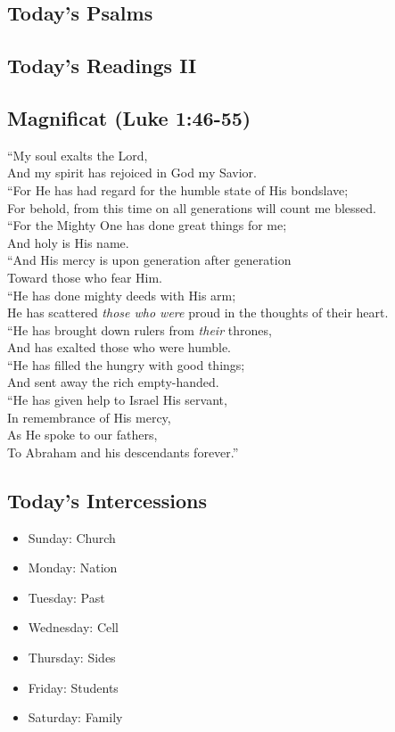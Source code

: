 \documentclass[14pt]{extbook}
\begin{document}
\subsection{Today's Psalms}

\subsection{Today's Readings II}

\newpage
\hypertarget{magnificat-luke-146-55}{%
\subsection{Magnificat (Luke 1:46-55)}\label{magnificat-luke-146-55}}

``My soul exalts the Lord,\\
And my spirit has rejoiced in God my Savior.\\
``For He has had regard for the humble state of His bondslave;\\
For behold, from this time on all generations will count me blessed.\\
``For the Mighty One has done great things for me;\\
And holy is His name.\\
``And His mercy is upon generation after generation\\
Toward those who fear Him.\\
``He has done mighty deeds with His arm;\\
He has scattered \emph{those who were} proud in the thoughts of their
heart.\\
``He has brought down rulers from \emph{their} thrones,\\
And has exalted those who were humble.\\
``He has filled the hungry with good things;\\
And sent away the rich empty-handed.\\
``He has given help to Israel His servant,\\
In remembrance of His mercy,\\
As He spoke to our fathers,\\
To Abraham and his descendants forever.''

\hypertarget{today-intercessions}{%
\subsection{Today's Intercessions}\label{today-intercessions}}
\begin{itemize}
\item Sunday: Church
\item Monday: Nation
\item Tuesday: Past
\item Wednesday: Cell
\item Thursday: Sides
\item Friday: Students
\item Saturday: Family
\end{itemize}
\end{document}
